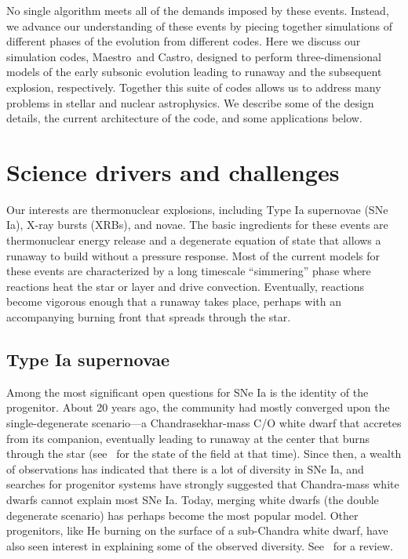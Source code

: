 \documentclass[a4paper]{jpconf}
\newcommand{\maestro}{{\sffamily Maestro}}
\newcommand{\castro}{{\sffamily Castro}}
\begin{document}
No single algorithm meets all of the demands imposed by these events.
Instead, we advance our understanding of these events by piecing
together simulations of different phases of the evolution from
different codes.  Here we discuss our simulation codes, \maestro\ and
\castro, designed to perform three-dimensional models of the early
subsonic evolution leading to runaway and the subsequent explosion,
respectively.  Together this suite of codes allows us to address many
problems in stellar and nuclear astrophysics.  We describe some of the
design details, the current architecture of the code, and some
applications below.

\section{Science drivers and challenges}

Our interests are thermonuclear explosions, including Type Ia
supernovae (SNe Ia), X-ray bursts (XRBs), and novae.  The basic
ingredients for these events are thermonuclear energy release and a
degenerate equation of state that allows a runaway to build without a
pressure response.  Most of the current models for these events are
characterized by a long timescale ``simmering'' phase where reactions
heat the star or layer and drive convection.  Eventually, reactions
become vigorous enough that a runaway takes place, perhaps with an
accompanying burning front that spreads through the star.

\subsection{Type Ia supernovae}

Among the most significant open questions for SNe Ia is the identity of the
progenitor.  About 20 years ago, the community had
mostly converged upon the single-degenerate scenario---a
Chandrasekhar-mass C/O white dwarf that accretes from its companion,
eventually leading to runaway at the center that burns through the
star (see~\cite{hillebrandtniemeyer2000} for the state of the field at
that time).  Since then, a wealth of observations has indicated that
there is a lot of diversity in SNe Ia, and searches for progenitor
systems have strongly suggested that Chandra-mass white dwarfs cannot
explain most SNe Ia.  Today, merging white dwarfs (the double
degenerate scenario) has perhaps become the most popular model.
Other progenitors, like He burning on the surface of a sub-Chandra
white dwarf, have also seen interest in explaining some of the observed
diversity.  See~\cite{araa-maoz} for a review.
\end{document}
